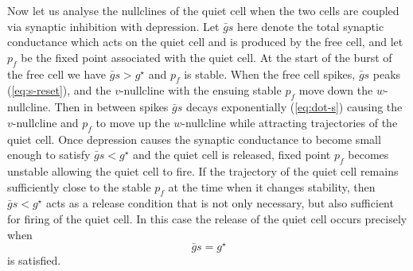 \documentclass[utf8,draft]{frontiersFPHY} %
\newcommand{\gbar}{\bar g}
\begin{document}

Now let us analyse the nullclines of the quiet cell when the two cells are coupled via synaptic inhibition with depression.
Let $\gbar s$ here denote the total synaptic conductance which acts on the quiet cell and is produced by the free cell, and let $p_{f}$ be the fixed point associated with the quiet cell.
At the start of the burst of the free cell we have $\gbar s > g^{\star}$ and $p_{f}$ is stable.
When the free cell spikes, $\gbar s$ peaks (\cref{eq:s-reset}), and the $v$-nullcline with the ensuing stable $p_f$ move down the $w$-nullcline.
Then in between spikes $\gbar s$ decays exponentially (\cref{eq:dot-s}) causing the $v$-nullcline and $p_{f}$ to move up the $w$-nullcline while attracting trajectories of the quiet cell.
Once depression causes the synaptic conductance to become small enough to satisfy $\gbar s<g^{\star}$ and the quiet cell is released, fixed point $p_{f}$ becomes unstable allowing the quiet cell to fire.
If the trajectory of the quiet cell remains sufficiently close to the stable $p_{f}$ at the time when it changes stability, then $\gbar s < g^{\star}$ acts as a release condition that is not only necessary, but also sufficient for firing of the quiet cell.
In this case the release of the quiet cell occurs precisely when
\begin{equation}
 ~\label{eq:release}
  \gbar s=g^{\star}
\end{equation}
is satisfied.
\end{document}
